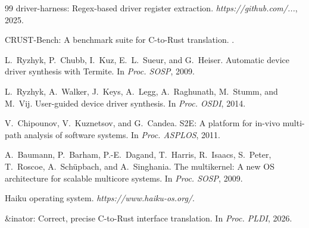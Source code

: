 \documentclass[sigplan, screen, review, anonymous]{acmart}
\begin{document}
\begin{thebibliography}{99}
\newblock driver-harness: Regex-based driver register extraction.
\newblock \emph{https://github.com/...}, 2025.

\newblock CRUST-Bench: A benchmark suite for C-to-Rust translation.
.

L.~Ryzhyk, P.~Chubb, I.~Kuz, E.~L.~Sueur, and G.~Heiser.
\newblock Automatic device driver synthesis with Termite.
\newblock In \emph{Proc. SOSP}, 2009.

L.~Ryzhyk, A.~Walker, J.~Keys, A.~Legg, A.~Raghunath, M.~Stumm, and M.~Vij.
\newblock User-guided device driver synthesis.
\newblock In \emph{Proc. OSDI}, 2014.

V.~Chipounov, V.~Kuznetsov, and G.~Candea.
\newblock S2E: A platform for in-vivo multi-path analysis of software systems.
\newblock In \emph{Proc. ASPLOS}, 2011.

A.~Baumann, P.~Barham, P.-E.~Dagand, T.~Harris, R.~Isaacs, S.~Peter, T.~Roscoe, A.~Schüpbach, and A.~Singhania.
\newblock The multikernel: A new OS architecture for scalable multicore systems.
\newblock In \emph{Proc. SOSP}, 2009.

\newblock Haiku operating system.
\newblock \emph{https://www.haiku-os.org/}.

\newblock \&inator: Correct, precise C-to-Rust interface translation.
\newblock In \emph{Proc. PLDI}, 2026.

\end{thebibliography}
\end{document}
